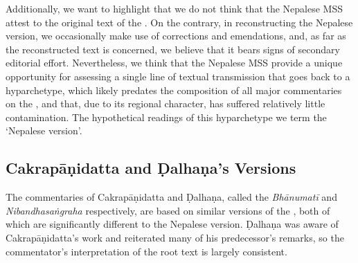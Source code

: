 
Additionally, we want to highlight that we do not think that the Nepalese MSS attest to the original text of the \SS. On the contrary, in reconstructing the Nepalese version, we occasionally make use of corrections and emendations, and, as far as the reconstructed text is concerned, we believe that it bears signs of secondary editorial effort.
Nevertheless, we think that the Nepalese MSS provide a unique opportunity for assessing a single line of textual transmission that goes back to a hyparchetype, which likely predates the composition of all major commentaries on the \SS, and that, due to its regional character, has suffered relatively little contamination. The hypothetical readings of this hyparchetype we term the `Nepalese version'. 


\subsection{Cakrapāṇidatta and Ḍalhaṇa's Versions}
The commentaries of Cakrapāṇidatta and Ḍalhaṇa, called the \emph{Bhānumatī} and \emph{Nibandhasaṅgraha} respectively, are based on similar versions of the \SS, both of which are significantly different to the Nepalese version. Ḍalhaṇa was aware of Cakrapāṇidatta's work and reiterated many of his predecessor's remarks, so the commentator's interpretation of the root text is largely consistent. 

